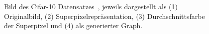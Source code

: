 \begin{figure}[t]
\centering
{}
  \caption[\gls{Cifar}-10]{Bild des \gls{Cifar}-10 Datensatzes~\cite{cifar_10}, jeweils dargestellt als (1) Originalbild, (2) Superpixelrepräsentation, (3) Durchschnittsfarbe der Superpixel und (4) als generierter Graph.}
\label{fig:cifar_10}
\end{figure}

